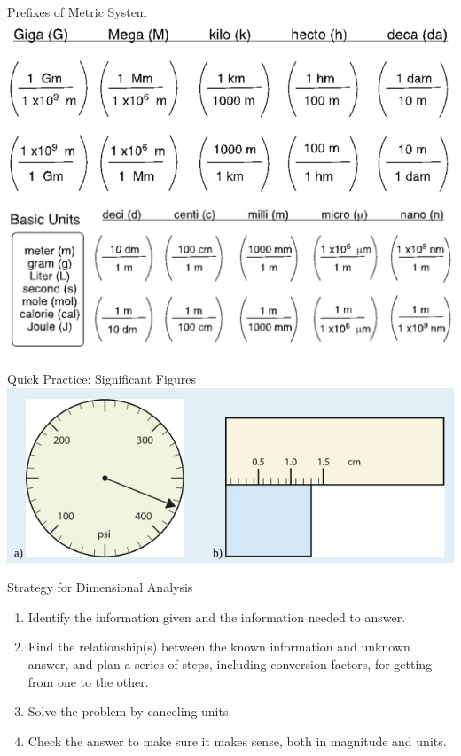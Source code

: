 \documentclass[11pt]{beamer}
\begin{document}
\begin{frame}{Prefixes of Metric System}
  \centering
  \includegraphics[scale=0.3]{metric_1}
  \includegraphics[scale=0.3]{metric_2}
\end{frame}

\begin{frame}{Quick Practice: Significant Figures}
  \centering
  \includegraphics[scale=0.45]{instrument_sig}
\end{frame}

\begin{frame}{Strategy for Dimensional Analysis}
  \begin{enumerate}
  \item Identify the information given and the
    information needed to answer.
  \item Find the relationship(s) between the known
    information and unknown answer, and plan a series
    of steps, including conversion factors, for getting from
    one to the other.
  \item Solve the problem by canceling units.
  \item Check the answer to make sure it makes sense,
    both in magnitude and units.
  \end{enumerate}
\end{frame}
\end{document}
